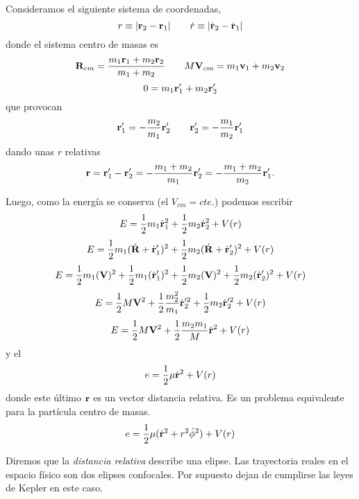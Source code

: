 \documentclass[10pt,oneside]{CBFT_article}
\begin{document}
Consideramos el siguiente sistema de coordenadas,
\[
	r \equiv | \vb{r}_2 - \vb{r}_1 |	\qquad		 \dot{r} \equiv | \dot{\vb{r}}_2 - \dot{\vb{r}}_1 |
\]
donde el sistema centro de masas es
\[
	\vb{R}_{cm} = \frac{ m_1\vb{r}_1 + m_2\vb{r}_2 }{ m_1 + m_2 }	\qquad 
	M \vb{V}_{cm} =  m_1\vb{v}_1 + m_2\vb{v}_2 
\]
\[
	0 = m_1\vb{r}_1' + m_2\vb{r}_2'
\]
que provocan
\[
	\vb{r}_1' = -\frac{m_2}{m_1}\vb{r}_2' \qquad   \vb{r}_2' = -\frac{m_1}{m_2}\vb{r}_1' 
\]
dando unas $r$ relativas
\[
	\vb{r} = \vb{r}_1' - \vb{r}_2' = -\frac{ m_1 + m_2 }{ m_1 } \vb{r}_2' = -\frac{ m_1 + m_2 }{ m_2 } \vb{r}_1'.
\]

Luego, como la energía se conserva (el $V_{cm}=cte.$) podemos escribir
\[
	E = \frac{1}{2} m_1 \dot{\vb{r}}_1^2 + \frac{1}{2} m_2 \dot{\vb{r}}_2^2 + V(r)
\]
\[
	E = \frac{1}{2} m_1 ( \dot{\vb{R}} + \dot{\vb{r}}_1' )^2 + \frac{1}{2} m_2 ( \dot{\vb{R}} + \dot{\vb{r}}_2' )^2 + V(r)
\]
\[
	E = \frac{1}{2} m_1 ( {\vb{V}} )^2 +  \frac{1}{2} m_1 ( \dot{\vb{r}}_1' )^2 + 
		\frac{1}{2} m_2 ( {\vb{V}})^2 + \frac{1}{2} m_2 (\dot{\vb{r}}_2' )^2 + V(r)
\]
\[
	E = \frac{1}{2} M {\vb{V}}^2 + \frac{1}{2} \frac{m_2^2}{m_1} \dot{\vb{r}}_2'^2 + \frac{1}{2} m_2 \dot{\vb{r}}_2'^2 + V(r)
\]
\[
	E = \frac{1}{2} M {\vb{V}}^2 + \frac{1}{2} \frac{m_2 m_1}{M} \dot{\vb{r}}^2 + V(r)
\]
y el 
\[
	e = \frac{1}{2} \mu \dot{\vb{r}}^2 + V(r)
\]
donde este último $\vb{r}$ es un vector distancia relativa. Es un problema equivalente para la partícula
centro de masas.
\[
	e = \frac{1}{2} \mu ( \dot{\vb{r}}^2 + r^2\dot{\phi}^2 ) + V(r)
\]

Diremos que la {\it distancia relativa} describe una elipse. Las trayectoria reales en el espacio físico
son dos elipses confocales. Por supuesto dejan de cumplirse las leyes de Kepler en este caso.












\end{document}

